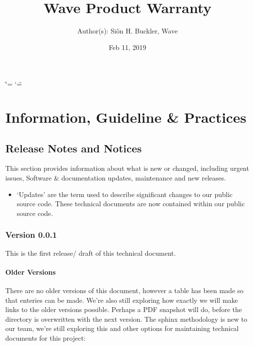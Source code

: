 \documentclass[letterpaper,10pt,openany,oneside,english]{sphinxmanual}
\title{Wave Product Warranty}
\date{Feb 11, 2019}
\author{Author(s): Siôn H. Buckler, Wave}
\begin{document}
\ifdefined\shorthandoff
  \ifnum\catcode`\=\string=\active\shorthandoff{=}\fi
  \ifnum\catcode`\"=\active{}\fi
\fi
\maketitle
\sphinxtableofcontents
{}\label{\detokenize{index::doc}}



\chapter{Information, Guideline \& Practices}
\label{\detokenize{index:information-guideline-practices}}

\section{Release Notes and Notices}
\label{\detokenize{releasenotes:release-notes-and-notices}}\label{\detokenize{releasenotes::doc}}
This section provides information about what is new or changed, including urgent issues, Software \& documentation updates, maintenance and new releases.
\begin{itemize}
\item {} 
‘Updates’ are the term used to describe significant changes to our public source code. These technical documents are now contained within our public source code.

\end{itemize}


\subsection{Version 0.0.1}
\label{\detokenize{releasenotes:version-0-0-1}}
This is the first release/ draft of this technical document.


\subsubsection{Older Versions}
\label{\detokenize{releasenotes:older-versions}}
There are no older versions of this document, however a table has been made so that enteries can be made. We’re also still exploring how exactly we will make links to the older versions possible. Perhaps a PDF snapshot will do, before the directory is overwritten with the next version. The sphinx methodology is new to our team, we’re still exploring this and other options for maintaining technical documents for this project:
\end{document}
